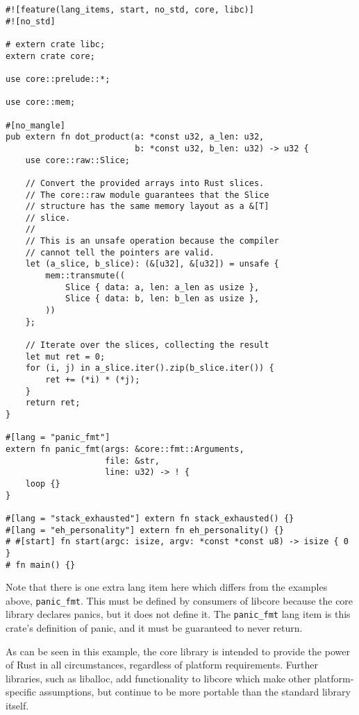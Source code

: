 \documentclass[a4paper,]{book}
\begin{document}
\begin{verbatim}
#![feature(lang_items, start, no_std, core, libc)]
#![no_std]

# extern crate libc;
extern crate core;

use core::prelude::*;

use core::mem;

#[no_mangle]
pub extern fn dot_product(a: *const u32, a_len: u32,
                          b: *const u32, b_len: u32) -> u32 {
    use core::raw::Slice;

    // Convert the provided arrays into Rust slices.
    // The core::raw module guarantees that the Slice
    // structure has the same memory layout as a &[T]
    // slice.
    //
    // This is an unsafe operation because the compiler
    // cannot tell the pointers are valid.
    let (a_slice, b_slice): (&[u32], &[u32]) = unsafe {
        mem::transmute((
            Slice { data: a, len: a_len as usize },
            Slice { data: b, len: b_len as usize },
        ))
    };

    // Iterate over the slices, collecting the result
    let mut ret = 0;
    for (i, j) in a_slice.iter().zip(b_slice.iter()) {
        ret += (*i) * (*j);
    }
    return ret;
}

#[lang = "panic_fmt"]
extern fn panic_fmt(args: &core::fmt::Arguments,
                    file: &str,
                    line: u32) -> ! {
    loop {}
}

#[lang = "stack_exhausted"] extern fn stack_exhausted() {}
#[lang = "eh_personality"] extern fn eh_personality() {}
# #[start] fn start(argc: isize, argv: *const *const u8) -> isize { 0 }
# fn main() {}
\end{verbatim}

Note that there is one extra lang item here which differs from the
examples above, \texttt{panic\_fmt}. This must be defined by consumers
of libcore because the core library declares panics, but it does not
define it. The \texttt{panic\_fmt} lang item is this crate's definition
of panic, and it must be guaranteed to never return.

As can be seen in this example, the core library is intended to provide
the power of Rust in all circumstances, regardless of platform
requirements. Further libraries, such as liballoc, add functionality to
libcore which make other platform-specific assumptions, but continue to
be more portable than the standard library itself.

\end{document}
